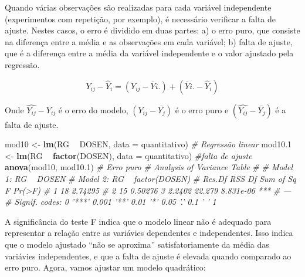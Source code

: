 \documentclass[
]{book}
\newenvironment{Shaded}{\begin{snugshade}}{\end{snugshade}}
\newcommand{\CommentTok}[1]{\textcolor[rgb]{0.56,0.35,0.01}{\textit{#1}}}
\newcommand{\DataTypeTok}[1]{\textcolor[rgb]{0.13,0.29,0.53}{#1}}
\newcommand{\FloatTok}[1]{\textcolor[rgb]{0.00,0.00,0.81}{#1}}
\newcommand{\KeywordTok}[1]{\textcolor[rgb]{0.13,0.29,0.53}{\textbf{#1}}}
\newcommand{\NormalTok}[1]{#1}
\newcommand{\OperatorTok}[1]{\textcolor[rgb]{0.81,0.36,0.00}{\textbf{#1}}}
\newcommand{\StringTok}[1]{\textcolor[rgb]{0.31,0.60,0.02}{#1}}
\begin{document}
Quando várias observações são realizadas para cada variável independente (experimentos com repetição, por exemplo), é necessário verificar a falta de ajuste. Nestes casos, o erro é dividido em duas partes: a) o erro puro,  que consiste na diferença entre a média e as observações em cada variável; b) falta de ajuste,  que é a diferença entre a média da variável independente e o valor ajustado pela regressão.

\[
{Y_{ij}} - {\hat Y_i} = \left( {{Y_{ij}} - {{\bar Y}{i.}}} \right) + \left( {{{\bar Y}{i.}} - {{\hat Y}_i}} \right)
\]

Onde \(\hat{Y_{ij}}-Y_{ij}\) é o erro do modelo, \((Y_{ij}-\bar{Y_j})\) é o erro puro e \((\hat{Y_{ij}}-\bar{Y_j})\) é a falta de ajuste.

\begin{Shaded}
\begin{Highlighting}[]
\NormalTok{mod10 <-}\StringTok{ }\KeywordTok{lm}\NormalTok{(RG }\OperatorTok{~}\StringTok{ }\NormalTok{DOSEN, }\DataTypeTok{data =}\NormalTok{ quantitativo) }\CommentTok{# Regressão linear}
\NormalTok{mod10}\FloatTok{.1}\NormalTok{ <-}\StringTok{ }\KeywordTok{lm}\NormalTok{(RG }\OperatorTok{~}\StringTok{  }\KeywordTok{factor}\NormalTok{(DOSEN), }\DataTypeTok{data =}\NormalTok{ quantitativo) }\CommentTok{#falta de ajuste}
\KeywordTok{anova}\NormalTok{(mod10, mod10}\FloatTok{.1}\NormalTok{) }\CommentTok{# Erro puro}
\CommentTok{# Analysis of Variance Table}
\CommentTok{# }
\CommentTok{# Model 1: RG ~ DOSEN}
\CommentTok{# Model 2: RG ~ factor(DOSEN)}
\CommentTok{#   Res.Df     RSS Df Sum of Sq      F    Pr(>F)    }
\CommentTok{# 1     18 2.74295                                  }
\CommentTok{# 2     15 0.50276  3    2.2402 22.279 8.831e-06 ***}
\CommentTok{# ---}
\CommentTok{# Signif. codes:  0 '***' 0.001 '**' 0.01 '*' 0.05 '.' 0.1 ' ' 1}
\end{Highlighting}
\end{Shaded}

A significância do teste F indica que o modelo linear não é adequado para representar a relação entre as variávies dependentes e independentes. Isso indica que o modelo ajustado ``não se aproxima'' satisfatoriamente da média das variávies independentes, e que a falta de ajuste  é elevada quando comparado ao erro puro. Agora, vamos ajustar um modelo quadrático:
\end{document}
